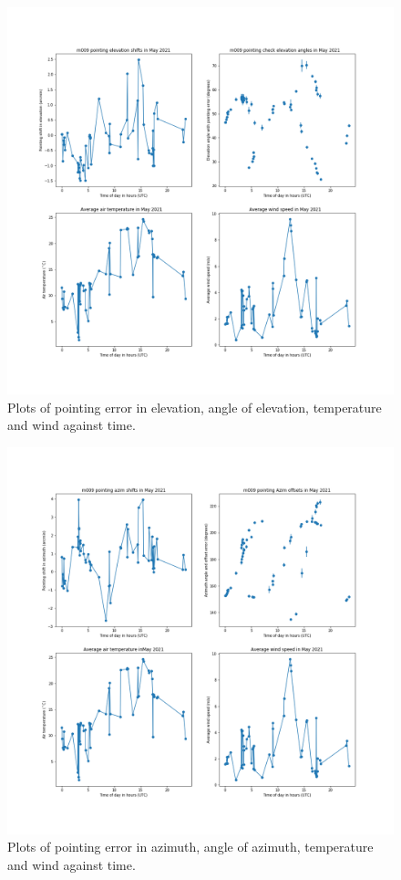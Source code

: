\documentclass{article}
\begin{document}
\begin{figure}[H]
	\centering
	\includegraphics[scale=0.45]{m009_elev_May_mapped.png}
	
	\caption{Plots of pointing error in elevation, angle of elevation, temperature and wind against time.}
	\label{fig:m009ElevMayMapped}
\end{figure}

\begin{figure}[H]
	\centering
	\includegraphics[scale=0.45]{m009_azim_May_mapped.png}
	
	\caption{Plots of pointing error in azimuth, angle of azimuth, temperature and wind against time.}
	\label{fig:m009AzimMayMapped}
\end{figure}
\end{document}
